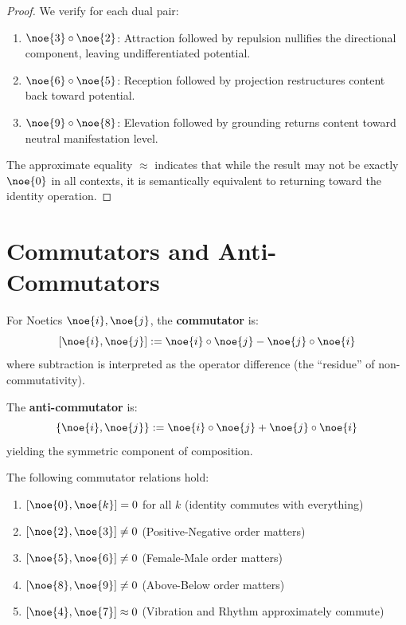 \begin{proof}
We verify for each dual pair:
\begin{enumerate}
  \item $\noe{3} \circ \noe{2}$: Attraction followed by repulsion nullifies the directional component, leaving undifferentiated potential.
  \item $\noe{6} \circ \noe{5}$: Reception followed by projection restructures content back toward potential.
  \item $\noe{9} \circ \noe{8}$: Elevation followed by grounding returns content toward neutral manifestation level.
\end{enumerate}
The approximate equality $\approx$ indicates that while the result may not be exactly $\noe{0}$ in all contexts, it is semantically equivalent to returning toward the identity operation.
\end{proof}

\section{Commutators and Anti-Commutators}

\begin{definition}
\label{def:commutator}
For Noetics $\noe{i}, \noe{j}$, the \textbf{commutator} is:
\[
[\noe{i}, \noe{j}] := \noe{i} \circ \noe{j} - \noe{j} \circ \noe{i}
\]
where subtraction is interpreted as the operator difference (the ``residue'' of non-commutativity).
\end{definition}

\begin{definition}
\label{def:anti-commutator}
The \textbf{anti-commutator} is:
\[
\{\noe{i}, \noe{j}\} := \noe{i} \circ \noe{j} + \noe{j} \circ \noe{i}
\]
yielding the symmetric component of composition.
\end{definition}

\begin{theorem}
\label{thm:commutators}
The following commutator relations hold:
\begin{enumerate}
  \item $[\noe{0}, \noe{k}] = 0$ for all $k$ (identity commutes with everything)
  \item $[\noe{2}, \noe{3}] \neq 0$ (Positive-Negative order matters)
  \item $[\noe{5}, \noe{6}] \neq 0$ (Female-Male order matters)
  \item $[\noe{8}, \noe{9}] \neq 0$ (Above-Below order matters)
  \item $[\noe{4}, \noe{7}] \approx 0$ (Vibration and Rhythm approximately commute)
\end{enumerate}
\end{theorem}

